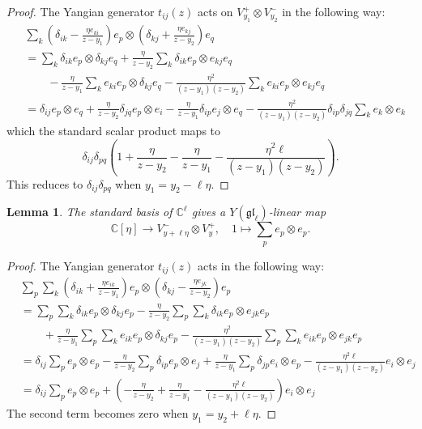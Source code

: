 \documentclass[11pt]{report}
\newtheorem{lemma}[theorem]{Lemma}
\theoremstyle{definition}
\theoremstyle{remark}
\theoremstyle{remark}
\newcommand{\C}{\mathbb{C}}
\begin{document}
\begin{proof}
The Yangian generator $t_{ij}(z)$ acts on $V_{y_1}^+ \otimes V_{y_2}^-$ in the following way:
\begin{align*}
&\sum_k \left( \delta_{ik}-\frac{\eta e_{ki}}{z-y_1} \right) e_p \otimes \left( \delta_{kj}+\frac{\eta e_{kj}}{z-y_2} \right) e_q \\
&= \sum_k \delta_{ik} e_p \otimes \delta_{kj} e_q + \frac{\eta}{z-y_2} \sum_k \delta_{ik} e_p \otimes e_{kj} e_q \\
& \quad \quad - \frac{\eta}{z-y_1} \sum_k e_{ki} e_p \otimes \delta_{kj} e_q
- \frac{\eta^2}{(z-y_1)(z-y_2)} \sum_k e_{ki} e_p \otimes e_{kj} e_q \\
&= \delta_{ij} e_p \otimes e_q
+ \frac{\eta}{z-y_2} \delta_{jq} e_p \otimes e_i
- \frac{\eta}{z-y_1} \delta_{ip} e_j \otimes e_q
- \frac{\eta^2}{(z-y_1)(z-y_2)} \delta_{ip} \delta_{jq} \sum_k e_k \otimes e_k
\end{align*}
which the standard scalar product maps to
\begin{equation*}
\delta_{ij} \delta_{pq} \left( 1
+ \frac{\eta}{z-y_2}
- \frac{\eta}{z-y_1}
- \frac{\eta^2 \ell}{(z-y_1)(z-y_2)} \right).
\end{equation*}
This reduces to $\delta_{ij} \delta_{pq}$ when $y_1 = y_2-\ell \eta$.
\end{proof}

\begin{lemma}
The standard basis of $\C^\ell$ gives a $Y(\mathfrak{gl}_\ell)$-linear map
\begin{equation*}
\C[\eta] \to V_{y+\ell \eta}^- \otimes V_y^+, \quad 1 \mapsto \sum_p e_p \otimes e_p.
\end{equation*}
\end{lemma}

\begin{proof}
The Yangian generator $t_{ij}(z)$ acts in the following way:
\begin{align*}
&\sum_p \sum_k \left( \delta_{ik}+\frac{\eta e_{ik}}{z-y_1} \right) e_p \otimes \left( \delta_{kj}-\frac{\eta e_{jk}}{z-y_2} \right) e_p \\
&= \sum_p \sum_k \delta_{ik} e_p \otimes \delta_{kj} e_p - \frac{\eta}{z-y_2} \sum_p \sum_k \delta_{ik} e_p \otimes e_{jk} e_p \\
& \quad \quad + \frac{\eta}{z-y_1} \sum_p \sum_k e_{ik} e_p \otimes \delta_{kj} e_p
- \frac{\eta^2}{(z-y_1)(z-y_2)} \sum_p \sum_k e_{ik} e_p \otimes e_{jk} e_p \\
&= \delta_{ij} \sum_p e_p \otimes e_p
- \frac{\eta}{z-y_2} \sum_p \delta_{ip} e_p\otimes e_j
+ \frac{\eta}{z-y_1} \sum_p \delta_{jp} e_i \otimes e_p
- \frac{\eta^2 \ell}{(z-y_1)(z-y_2)} e_i \otimes e_j \\
&= \delta_{ij} \sum_p e_p \otimes e_p
+ \left(- \frac{\eta}{z-y_2}
+ \frac{\eta}{z-y_1}
- \frac{\eta^2 \ell}{(z-y_1)(z-y_2)} \right) e_i \otimes e_j
\end{align*}
The second term becomes zero when $y_1 = y_2 + \ell \eta$.
\end{proof}
\end{document}
